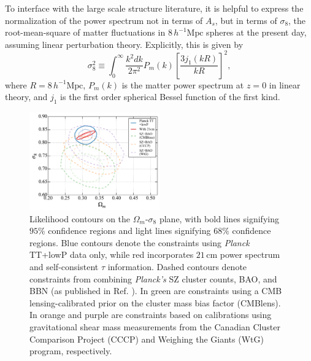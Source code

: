 \documentclass[twocolumn,aps,prd,nofootinbib,showpacs,superscriptaddress]{revtex4-1}
\begin{document}
To interface with the large scale structure literature, it is helpful to express the normalization of the power spectrum not in terms of $A_s$, but in terms of $\sigma_8$, the root-mean-square of matter fluctuations in $8\,h^{-1}\textrm{Mpc}$ spheres at the present day, assuming linear perturbation theory. Explicitly, this is given by
\begin{equation}
\sigma_8^2 \equiv \int_0^\infty \frac{k^2 dk}{2 \pi^2} P_m (k) \left[ \frac{3 j_1 (kR)}{kR}\right]^2,
\end{equation}
where $R= 8\,h^{-1}\textrm{Mpc}$, $P_m(k)$ is the matter power spectrum at $z=0$ in linear theory, and $j_1$ is the first order spherical Bessel function of the first kind.

\begin{figure}[!]
\centering
\includegraphics[width=0.5\textwidth]{figures/omegamsigma8.pdf}
\caption{Likelihood contours on the $\Omega_m$-$\sigma_8$ plane, with bold lines signifying $95\%$ confidence regions and light lines signifying $68\%$ confidence regions. Blue contours denote the constraints using \emph{Planck} TT+lowP data only, while red incorporates $21\,\textrm{cm}$ power spectrum and self-consistent $\tau$ information. Dashed contours denote constraints from combining \emph{Planck's} SZ cluster counts, BAO, and BBN (as published in Ref. \cite{Planck2015clusters}). In green are constraints using a CMB lensing-calibrated prior on the cluster mass bias factor (CMBlens). In orange and purple are constraints based on calibrations using gravitational shear mass measurements from the Canadian Cluster Comparison Project (CCCP) and Weighing the Giants (WtG) program, respectively.}
\label{fig:omegamsigma8}
\end{figure}
\end{document}
